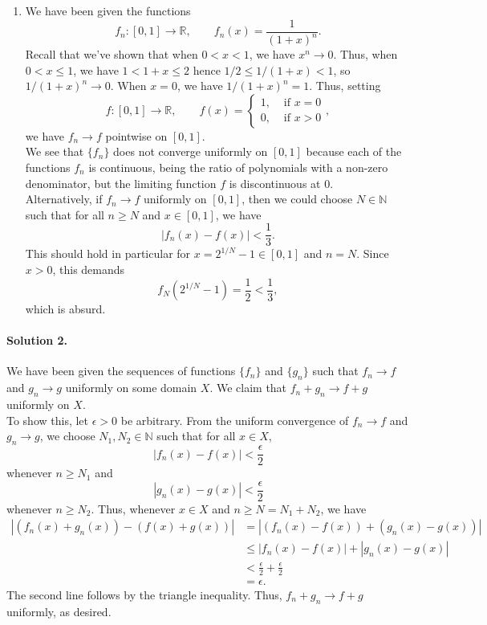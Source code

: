 \documentclass[10pt]{article}
\def\R{\mathbb{R}}
\def\N{\mathbb{N}}
\begin{document}
\begin{enumerate}
        \item We have been given the functions \[
            f_n\colon [0, 1] \to \R, \qquad f_n(x) = \frac{1}{(1 + x)^n}.
        \] Recall that we've shown that when $0 < x < 1$, we have $x^n \to 0$.
        Thus, when $0 < x \leq 1$, we have $1 < 1 + x \leq 2$ hence
        $1 /2 \leq 1 / (1 + x) < 1$, so $1 / (1 + x)^n \to 0$.
        When $x = 0$, we have $1 / (1 + x)^n = 1$. Thus, setting \[
            f\colon [0, 1] \to \R, \qquad f(x) = \begin{cases}
                1, &\text{ if } x = 0 \\
                0, &\text{ if } x > 0
            \end{cases},
        \] we have $f_n \to f$ pointwise on $[0, 1]$. \\

        We see that $\{f_n\}$ does not converge uniformly on $[0, 1]$ because each
        of the functions $f_n$ is continuous, being the ratio of polynomials with a
        non-zero denominator, but the limiting function $f$ is discontinuous at $0$.
        \\

        Alternatively, if $f_n \to f$ uniformly on $[0, 1]$, then we could choose $N
        \in \N$ such that for all $n \geq N$ and $x \in [0, 1]$, we have \[
            |f_n(x) - f(x)| < \frac{1}{3}.
        \] This should hold in particular for $x = 2^{1 / N} - 1 \in [0, 1]$ and $n
        = N$. Since $x > 0$, this demands \[
            f_N(2^{1 / N} - 1) = \frac{1}{2} < \frac{1}{3},
        \] which is absurd.
    \end{enumerate}

    \paragraph{Solution 2.} We have been given the sequences of functions $\{f_n\}$
    and $\{g_n\}$ such that $f_n \to f$ and $g_n \to g$ uniformly on some domain
    $X$. We claim that $f_n + g_n \to f + g$ uniformly on $X$. \\
    
    To show this, let $\epsilon > 0$ be arbitrary. From the uniform convergence of
    $f_n \to f$ and $g_n \to g$, we choose $N_1, N_2 \in \N$ such that for all $x
    \in X$, \[
        |f_n(x) - f(x)| < \frac{\epsilon}{2}
    \] whenever $n \geq N_1$ and \[
        |g_n(x) - g(x)| < \frac{\epsilon}{2}
    \] whenever $n \geq N_2$. Thus, whenever $x \in X$ and $n \geq N = N_1 + N_2$,
    we have
    \begin{align*}
        |(f_n(x) + g_n(x)) - (f(x) + g(x))| &= |(f_n(x) - f(x)) + (g_n(x) - g(x))| \\
            &\leq |f_n(x) - f(x)| + |g_n(x) - g(x)| \\
            &< \frac{\epsilon}{2} + \frac{\epsilon}{2} \\
            &= \epsilon.  
    \end{align*}
    The second line follows by the triangle inequality.
    Thus, $f_n + g_n \to f + g$ uniformly, as desired.
\end{document}

